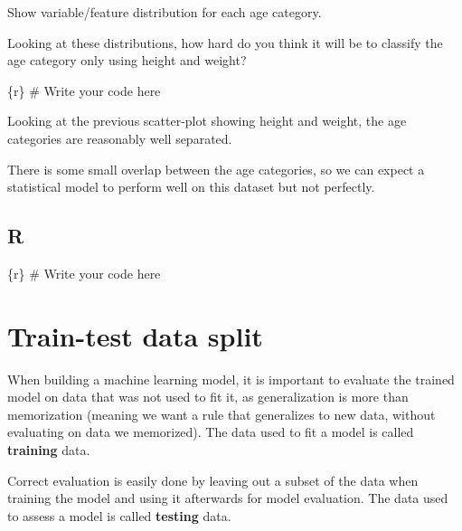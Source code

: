 \documentclass[
  letterpaper,
  DIV=11,
  numbers=noendperiod,
  oneside]{scrreprt}
\newenvironment{Shaded}{\begin{snugshade}}{\end{snugshade}}
\newcommand{\CommentTok}[1]{\textcolor[rgb]{0.37,0.37,0.37}{#1}}
\newcommand{\InformationTok}[1]{\textcolor[rgb]{0.37,0.37,0.37}{#1}}
\begin{document}
Show variable/feature distribution for each age category.

Looking at these distributions, how hard do you think it will be to
classify the age category only using height and weight?

\begin{Shaded}
\begin{Highlighting}[]
\InformationTok{\textasciigrave{}\textasciigrave{}\textasciigrave{}\{r\}}
\CommentTok{\# Write your code here}
\InformationTok{\textasciigrave{}\textasciigrave{}\textasciigrave{}}
\end{Highlighting}
\end{Shaded}

Looking at the previous scatter-plot showing height and weight, the age
categories are reasonably well separated.

There is some small overlap between the age categories, so we can expect
a statistical model to perform well on this dataset but not perfectly.

\subsection{R}

\begin{Shaded}
\begin{Highlighting}[]
\InformationTok{\textasciigrave{}\textasciigrave{}\textasciigrave{}\{r\}}
\CommentTok{\# Write your code here}
\InformationTok{\textasciigrave{}\textasciigrave{}\textasciigrave{}}
\end{Highlighting}
\end{Shaded}

\hypertarget{train-test-data-split}{%
\section{Train-test data split}\label{train-test-data-split}}

When building a machine learning model, it is important to evaluate the
trained model on data that was not used to fit it, as generalization is
more than memorization (meaning we want a rule that generalizes to new
data, without evaluating on data we memorized). The data used to fit a
model is called \textbf{training} data.

Correct evaluation is easily done by leaving out a subset of the data
when training the model and using it afterwards for model evaluation.
The data used to assess a model is called \textbf{testing} data.
\end{document}
